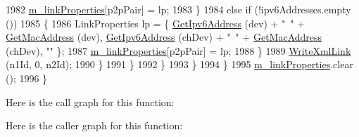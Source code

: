 \begin{DoxyCode}
1982                           \hyperlink{classns3_1_1AnimationInterface_a8f40a5be6a97ed9f1e2692a604b27d15}{m\_linkProperties}[p2pPair] = lp;
1983                         \}
1984                       \textcolor{keywordflow}{else} \textcolor{keywordflow}{if} (!ipv6Addresses.empty ())
1985                         \{
1986                           LinkProperties lp = \{ \hyperlink{classns3_1_1AnimationInterface_a89512d6e59613518d1b880e81ab6db1b}{GetIpv6Address} (dev) + \textcolor{stringliteral}{"~"} + 
      \hyperlink{classns3_1_1AnimationInterface_a82c8e06d9c44523db90adb5424c08806}{GetMacAddress} (dev), \hyperlink{classns3_1_1AnimationInterface_a89512d6e59613518d1b880e81ab6db1b}{GetIpv6Address} (chDev) + \textcolor{stringliteral}{"~"} + 
      \hyperlink{classns3_1_1AnimationInterface_a82c8e06d9c44523db90adb5424c08806}{GetMacAddress} (chDev), \textcolor{stringliteral}{""} \};
1987                           \hyperlink{classns3_1_1AnimationInterface_a8f40a5be6a97ed9f1e2692a604b27d15}{m\_linkProperties}[p2pPair] = lp;
1988                         \}
1989                       \hyperlink{classns3_1_1AnimationInterface_afc4385b58dc89ec2304f4173d27d168a}{WriteXmlLink} (n1Id, 0, n2Id);
1990                     \}
1991                 \}
1992             \}
1993         \}
1994     \}
1995   \hyperlink{classns3_1_1AnimationInterface_a8f40a5be6a97ed9f1e2692a604b27d15}{m\_linkProperties}.clear ();
1996 \}
\end{DoxyCode}


Here is the call graph for this function\+:




Here is the caller graph for this function\+:


